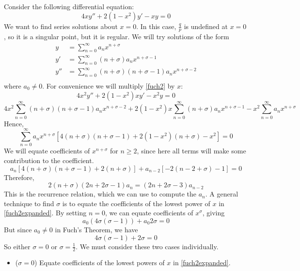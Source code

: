 \begin{example}
	Consider the following differential equation:
	\begin{equation}\label{fuch2}
		4xy'' + 2(1-x^2)y' - xy = 0
	\end{equation}
	We want to find series solutions about \(x=0\).
	In this case, \(\frac{q}{p}\) is undefined at \(x=0\), so it is a singular point, but it is regular.
	We will try solutions of the form
	\begin{align*}
		y   & = \sum_{n=0}^\infty a_n x^{n + \sigma}                         \\
		y'  & = \sum_{n=0}^\infty (n+\sigma)a_n x^{n + \sigma-1}             \\
		y'' & = \sum_{n=0}^\infty (n+\sigma)(n+\sigma-1)a_n x^{n + \sigma-2} \\
	\end{align*}
	where \(a_0 \neq 0\).
	For convenience we will multiply \eqref{fuch2} by \(x\):
	\[
		4x^2y'' + 2(1-x^2)xy' - x^2y = 0
	\]
	\[
		4x^2\sum_{n=0}^\infty (n+\sigma)(n+\sigma-1)a_n x^{n + \sigma-2} + 2(1-x^2)x\sum_{n=0}^\infty (n+\sigma)a_n x^{n + \sigma-1} - x^2\sum_{n=0}^\infty a_n x^{n + \sigma}
	\]
	Hence,
	\begin{equation}\label{fuch2expanded}
		\sum_{n=0}^\infty a_n x^{n + \sigma}\left[4(n+\sigma)(n+\sigma-1) + 2\left(1-x^2\right)(n+\sigma) - x^2\right] = 0
	\end{equation}
	We will equate coefficients of \(x^{n+\sigma}\) for \(n\geq 2\), since here all terms will make some contribution to the coefficient.
	\[
		a_n\left[4(n+\sigma)(n+\sigma-1) + 2(n+\sigma)\right] + a_{n-2}\left[-2(n-2+\sigma) - 1\right] = 0
	\]
	Therefore,
	\begin{equation}\label{fuch2recurrence}
		2(n+\sigma)(2n+2\sigma-1)a_n = (2n+2\sigma-3)a_{n-2}
	\end{equation}
	This is the recurrence relation, which we can use to compute the \(a_n\).
	A general technique to find \(\sigma\) is to equate the coefficients of the lowest power of \(x\) in \eqref{fuch2expanded}.
	By setting \(n=0\), we can equate coefficients of \(x^\sigma\), giving
	\[
		a_0(4\sigma(\sigma - 1)) + a_0 2\sigma = 0
	\]
	But since \(a_0 \neq 0\) in Fuch's Theorem, we have
	\[
		4\sigma(\sigma - 1) + 2\sigma = 0
	\]
	So either \(\sigma = 0\) or \(\sigma = \frac{1}{2}\).
	We must consider these two cases individually.
	\begin{itemize}
		\item (\(\sigma = 0\)) Equate coefficients of the lowest powers of \(x\) in \eqref{fuch2expanded}.

\end{itemize}
\end{example}

